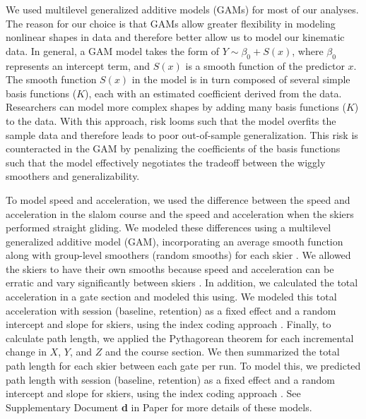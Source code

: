 We used multilevel generalized additive models (GAMs) \cite{pedersen_hierarchical_2019, wood_generalized_2017} for most of our analyses. The reason for our choice is that GAMs allow greater flexibility in modeling nonlinear shapes in data and therefore better allow us to model our kinematic data. In general, a GAM model takes the form of $Y \sim \beta_0 + S(x)$, where $\beta_0$ represents an intercept term, and $S(x)$ is a smooth function of the predictor $x$. The smooth function $S(x)$ in the model is in turn composed of several simple basis functions ($K$), each with an estimated coefficient derived from the data. Researchers can model more complex shapes by adding many basis functions ($K$) to the data. With this approach, risk looms such that the model overfits the sample data and therefore leads to poor out-of-sample generalization. This risk is counteracted in the GAM by penalizing the coefficients of the basis functions such that the model effectively negotiates the tradeoff between the wiggly smoothers and generalizability. 

To model speed and acceleration, we used the difference between the speed and acceleration in the slalom course and the speed and acceleration when the skiers performed straight gliding. We modeled these differences using a multilevel generalized additive model (GAM), incorporating an average smooth function along with group-level smoothers (random smooths) for each skier \cite{pedersen_hierarchical_2019}. We allowed the skiers to have their own smooths because speed and acceleration can be erratic and vary significantly between skiers \cite{federolf_quantifying_2012, reid_kinematic_2010, supej_impact_2015}. In addition, we calculated the total acceleration in a gate section and modeled this using. We modeled this total acceleration with session (baseline, retention) as a fixed effect and a random intercept and slope for skiers, using the index coding approach \cite{mcelreath_statistical_2018}. Finally, to calculate path length, we applied the Pythagorean theorem for each incremental change in $X$, $Y$, and $Z$ and the course section. We then summarized the total path length for each skier between each gate per run. To model this, we predicted path length with session (baseline, retention) as a fixed effect and a random intercept and slope for skiers, using the index coding approach \cite{mcelreath_statistical_2018}. See Supplementary Document \textbf{d} in Paper  for more details of these models. 

